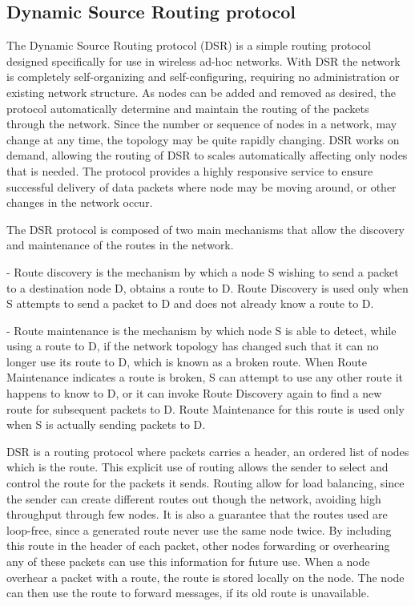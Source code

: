 \subsection{Dynamic Source Routing protocol}
The Dynamic Source Routing protocol (DSR) is a simple routing protocol designed specifically for use in wireless ad-hoc networks.
With DSR the network is completely self-organizing and self-configuring, requiring no administration or existing network structure\cite{DSR}.
As nodes can be added and removed as desired, the protocol automatically determine and maintain the routing of the packets through the network.
Since the number or sequence of nodes in a network, may change at any time, the topology may be quite rapidly changing.
DSR works on demand, allowing the routing of DSR to scales automatically affecting only nodes that is needed.
The protocol provides a highly responsive service to ensure successful delivery of data packets where node may be moving around, or other changes in the network occur\cite{DSR}. 

The DSR protocol is composed of two main mechanisms that allow the discovery and maintenance of the routes in the network.

- Route discovery is the mechanism by which a node S wishing to send a packet to a destination node D, obtains a route to D.
Route Discovery is used only when S attempts to send a packet to D and does not already know a route to D.

- Route maintenance is the mechanism by which node S is able to detect, while using a route to D, if the network topology has changed such that it can no longer use its route to D, which is known as a broken route.
When Route Maintenance indicates a route is broken, S can attempt to use any other route it happens to know to D, or it can invoke Route Discovery again to find a new route for subsequent packets to D.
Route Maintenance for this route is used only when S is actually sending packets to D.

DSR is a routing protocol where packets carries a header, an ordered list of nodes which is the route.
This explicit use of routing allows the sender to select and control the route for the packets it sends.
Routing allow for load balancing, since the sender can create different routes out though the network, avoiding high throughput through few nodes.
It is also a guarantee that the routes used are loop-free, since a generated route never use the same node twice.
By including this route in the header of each packet, other nodes forwarding or overhearing any of these packets can use this information for future use\cite{DSR}.
When a node overhear a packet with a route, the route is stored locally on the node.
The node can then use the route to forward messages, if its old route is unavailable.

